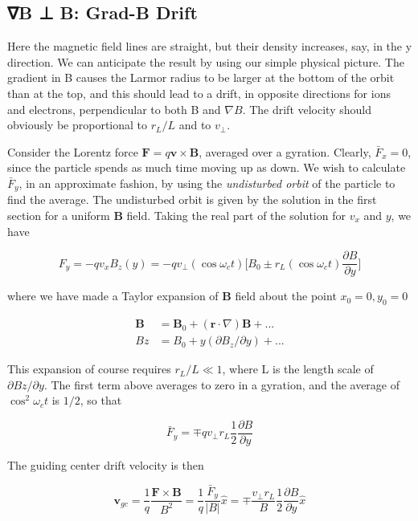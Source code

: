 \documentclass[
  notoc %
]{tufte-book}
\begin{document}
\hypertarget{b-b-grad-b-drift}{%
\subsection{∇B ⊥ B: Grad-B Drift}\label{b-b-grad-b-drift}}

Here the magnetic field lines are straight, but their density increases,
say, in the y direction. We can anticipate the result by using our
simple physical picture. The gradient in \textbar B\textbar{} causes the
Larmor radius to be larger at the bottom of the orbit than at the top,
and this should lead to a drift, in opposite directions for ions and
electrons, perpendicular to both B and \(\nabla B\). The drift velocity
should obviously be proportional to \(r_L/L\) and to \(v_\perp\).

Consider the Lorentz force \(\mathbf{F} = q\mathbf{v}\times\mathbf{B}\),
averaged over a gyration. Clearly, \(\bar{F}_x = 0\), since the particle
spends as much time moving up as down. We wish to calculate
\(\bar{F}_y\), in an approximate fashion, by using the \emph{undisturbed
orbit} of the particle to find the average. The undisturbed orbit is
given by the solution in the first section for a uniform \(\mathbf{B}\)
field. Taking the real part of the solution for \(v_x\) and \(y\), we
have

\[
F_y = -q v_x B_z(y) = -q v_\perp(\cos \omega_c t) \Big[ B_0 \pm r_L(\cos\omega_c t )\frac{\partial B}{\partial y} \Big]
\]

where we have made a Taylor expansion of \(\mathbf{B}\) field about the
point \(x_0=0, y_0=0\)

\[
\begin{aligned}
\mathbf{B} &= \mathbf{B}_0 + (\mathbf{r}\cdot\nabla)\mathbf{B} + ... \\
Bz &= B_0 + y(\partial B_z/\partial y) + ...
\end{aligned}
\]

This expansion of course requires \(r_L / L \ll 1\), where L is the
length scale of \(\partial Bz/\partial y\). The first term above
averages to zero in a gyration, and the average of \(\cos^2 \omega_c t\)
is \(1/2\), so that

\[
\bar{F}_y = \mp q v_\perp r_L \frac{1}{2}\frac{\partial B}{\partial y}
\]

The guiding center drift velocity is then

\[
\mathbf{v}_{gc} = \frac{1}{q}\frac{\mathbf{F}\times\mathbf{B}}{B^2} = \frac{1}{q}\frac{\bar{F}_y}{|B|}\widehat{x} = \mp \frac{v_\perp r_L}{B}\frac{1}{2} \frac{\partial B}{\partial y} \widehat{x}
\]
\end{document}
